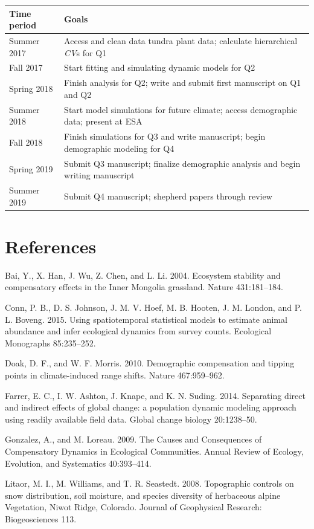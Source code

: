 \documentclass[12pt,]{article}
\begin{document}
\footnotesize{}

\begin{longtable}[c]{@{}ll@{}}
\toprule
Time period & Goals\tabularnewline
\midrule
\endhead
Summer 2017 & Access and clean data tundra plant data; calculate
hierarchical \emph{CV}s for Q1\tabularnewline
Fall 2017 & Start fitting and simulating dynamic models for
Q2\tabularnewline
Spring 2018 & Finish analysis for Q2; write and submit first manuscript
on Q1 and Q2\tabularnewline
Summer 2018 & Start model simulations for future climate; access
demographic data; present at ESA\tabularnewline
Fall 2018 & Finish simulations for Q3 and write manuscript; begin
demographic modeling for Q4\tabularnewline
Spring 2019 & Submit Q3 manuscript; finalize demographic analysis and
begin writing manuscript\tabularnewline
Summer 2019 & Submit Q4 manuscript; shepherd papers through
review\tabularnewline
\bottomrule
\end{longtable}

\normalsize{}

\setlength{\parindent}{0ex}

\section{References}\label{references}

\footnotesize{}

Bai, Y., X. Han, J. Wu, Z. Chen, and L. Li. 2004. Ecosystem stability
and compensatory effects in the Inner Mongolia grassland. Nature
431:181--184.

Conn, P. B., D. S. Johnson, J. M. V. Hoef, M. B. Hooten, J. M. London,
and P. L. Boveng. 2015. Using spatiotemporal statistical models to
estimate animal abundance and infer ecological dynamics from survey
counts. Ecological Monographs 85:235--252.

Doak, D. F., and W. F. Morris. 2010. Demographic compensation and
tipping points in climate-induced range shifts. Nature 467:959--962.

Farrer, E. C., I. W. Ashton, J. Knape, and K. N. Suding. 2014.
Separating direct and indirect effects of global change: a population
dynamic modeling approach using readily available field data. Global
change biology 20:1238--50.

Gonzalez, A., and M. Loreau. 2009. The Causes and Consequences of
Compensatory Dynamics in Ecological Communities. Annual Review of
Ecology, Evolution, and Systematics 40:393--414.

Litaor, M. I., M. Williams, and T. R. Seastedt. 2008. Topographic
controls on snow distribution, soil moisture, and species diversity of
herbaceous alpine Vegetation, Niwot Ridge, Colorado. Journal of
Geophysical Research: Biogeosciences 113.
\end{document}

